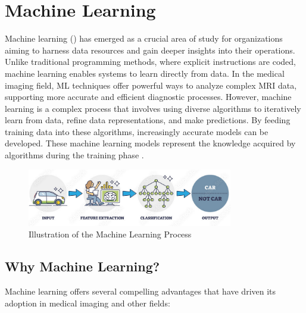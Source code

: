 \section{Machine Learning}
\label{sec:ml}
Machine learning () has emerged as a crucial area of study for organizations aiming to harness data resources and gain deeper insights into their operations. Unlike traditional programming methods, where explicit instructions are coded, machine learning enables systems to learn directly from data. In the medical imaging field, ML techniques offer powerful ways to analyze complex MRI data, supporting more accurate and efficient diagnostic processes. However, machine learning is a complex process that involves using diverse algorithms to iteratively learn from data, refine data representations, and make predictions. By feeding training data into these algorithms, increasingly accurate models can be developed. These machine learning models represent the knowledge acquired by algorithms during the training phase \cite{hurwitz2018mlfd}.

\begin{figure}[H]
  \centering
  \includegraphics[width=0.8\textwidth]{Images/Chapter1/ml.png}
  \caption{Illustration of the Machine Learning Process \cite{alltius2025deeplearning}}
  \label{fig:ml}
\end{figure}


\subsection{Why Machine Learning?}
\label{sec:why_ml}
Machine learning offers several compelling advantages that have driven its adoption in medical imaging and other fields:

